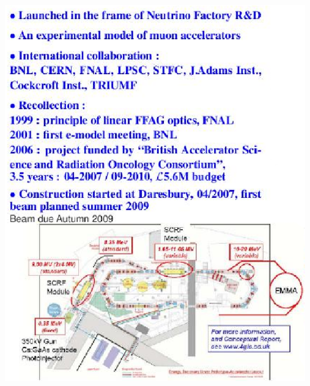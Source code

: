\documentclass[12pt]{article}
\begin{document}
\begin{minipage}[c]{0.5\linewidth}
  \begin{center}
  \includegraphics*[width=13.00cm]{./figs_FFAG_introSlides/emmaPage.eps}
  \end{center}
\end{minipage}



\clearpage
\end{document}
